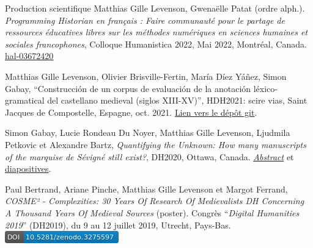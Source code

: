 \begin{rubric}{Production scientifique}
                    \entry*
                Matthias Gille Levenson, Gwenaëlle Patat (ordre alph.). \textit{Programming
                            Historian en français : Faire communauté pour le partage de ressources
                            éducatives libres sur les méthodes numériques en sciences humaines et
                            sociales francophones}, Colloque Humanistica 2022, Mai 2022, Montréal,
                        Canada. \href{https://hal.archives-ouvertes.fr/hal-03672420}{hal-03672420}
                    
                    \entry*
                Matthias Gille Levenson, Olivier Brisville-Fertin, María Díez Yáñez, Simon
                        Gabay, \enquote{Construcción de un corpus de evaluación de la anotación
                                léxico-gramatical del castellano medieval (siglos XIII-XV)},
                        HDH2021: scire vias, Saint Jacques de Compostelle, Espagne, oct. 2021. \href{https://gitlab.huma-num.fr/mgillelevenson/paper_hdh_lematizacion}{Lien
                            vers le dépôt git}.
                    
                    \entry*
                Simon Gabay, Lucie Rondeau Du Noyer, Matthias Gille Levenson, Ljudmila
                        Petkovic et Alexandre Bartz, \textit{\textit{Quantifying the Unknown: How many
                                manuscripts of the marquise de Sévigné still exist?}}, DH2020,
                        Ottawa, Canada. \href{https://hal.archives-ouvertes.fr/hal-02898929/document}{\textit{Abstract}} et \href{http://dx.doi.org/10.17613/2pwa-0f46}{diapositives}.
                    
                    \entry*
                Paul Bertrand, Ariane Pinche, Matthias Gille Levenson et Margot Ferrand,
                            \textit{COSME² - Complexities: 30 Years Of Research Of
                                Medievalists DH Concerning A Thousand Years Of Medieval
                            Sources} (poster). Congrès \enquote{\textit{Digital Humanities
                            2019}} (DH2019), du 9 au 12 juillet 2019, Utrecht, Pays-Bas. \href{https://zenodo.org/record/3275597}{\includegraphics[scale=0.55]{img/zenodo3275597.png}}
                    
                \vspace{1cm}
            

\end{rubric}
